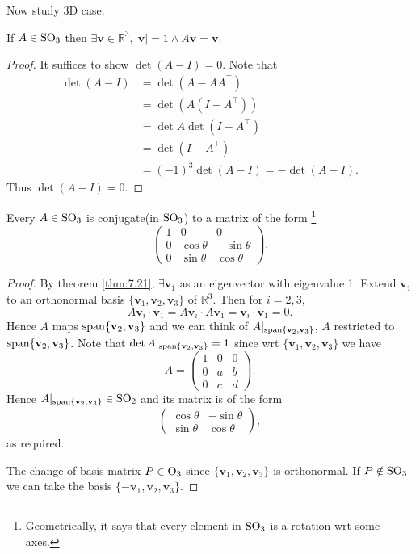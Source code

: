 \documentclass[a4paper]{article}
\begin{document}
    Now study 3D case.
    \begin{theorem}\label{thm:7.21}
        If $ A\in \mathrm{SO}_3 $ then $ \exists \mathbf{v}\in \mathbb{R}^{3}, |\mathbf{v}|=1 \land  A\mathbf{v}=\mathbf{v} $.
    \end{theorem}
    \begin{proof}
        It suffices to show $ \det (A-I)=0 $. Note that 
        \begin{align*}
            \det (A-I)&= \det (A-A A^\top)\\
            &= \det (A(I-A^\top))\\
            &= \det A \det (I-A^\top)\\
            &= \det (I-A^\top)\\
            &= (-1)^3\det(A-I)=-\det (A-I). 
        \end{align*}
        Thus $ \det (A-I)=0 $.
    \end{proof}
    \begin{corollary}\label{col:7.22}
        Every $ A\in \mathrm{SO}_3 $ is conjugate(in $ \mathrm{SO}_3 $) to a matrix of the form \footnote{Geometrically, it says that every element in $ \mathrm{SO}_3 $ is a rotation wrt some axes.}
        \[
            \begin{pmatrix}
                1&0&0\\
                0&\cos \theta& -\sin \theta\\
                0&\sin \theta& \cos \theta
            \end{pmatrix}.
        \]
    \end{corollary}
    \begin{proof}
        By theorem \ref{thm:7.21}, $ \exists \mathbf{v}_1 $ as an eigenvector with eigenvalue 1. Extend $\mathbf{v}_1$ to an orthonormal basis $ \{\mathbf{v}_1,\mathbf{v}_2,\mathbf{v}_3\} $ of $ \mathbb{R}^{3} $. Then for $i=2,3$,
        \[
            A\mathbf{v}_i \cdot \mathbf{v}_1 = A\mathbf{v}_i \cdot A\mathbf{v}_1 = \mathbf{v}_i \cdot \mathbf{v}_1 = 0.
        \]
        Hence $ A $ maps $ \operatorname{span}\{\mathbf{v}_2,\mathbf{v}_3\} $ and we can think of $A|_{\operatorname{span}\{\mathbf{v}_2,\mathbf{v}_3\}}$, $A$ restricted to $\operatorname{span}\{\mathbf{v}_2,\mathbf{v}_3\}$. Note that $\det A|_{\operatorname{span}\{\mathbf{v}_2,\mathbf{v}_3\}}=1$ since wrt $\{\mathbf{v}_1,\mathbf{v}_2,\mathbf{v}_3\}$ we have 
        \[
            A=\begin{pmatrix}
                1&0&0\\
                0&a& b\\
                0&c& d
            \end{pmatrix}.
        \]
        Hence $A|_{\operatorname{span}\{\mathbf{v}_2,\mathbf{v}_3\}}\in \mathrm{SO}_2$ and its matrix is of the form 
        \[
            \begin{pmatrix}
                \cos \theta& -\sin \theta\\
                \sin \theta& \cos \theta
            \end{pmatrix},
        \]
        as required.

        The change of basis matrix $P\in \mathrm{O}_3$ since $\{\mathbf{v}_1,\mathbf{v}_2,\mathbf{v}_3\}$ is orthonormal. If $P\notin \mathrm{SO}_3$ we can take the basis $ \{-\mathbf{v}_1,\mathbf{v}_2,\mathbf{v}_3\} $.
    \end{proof}
\end{document}

